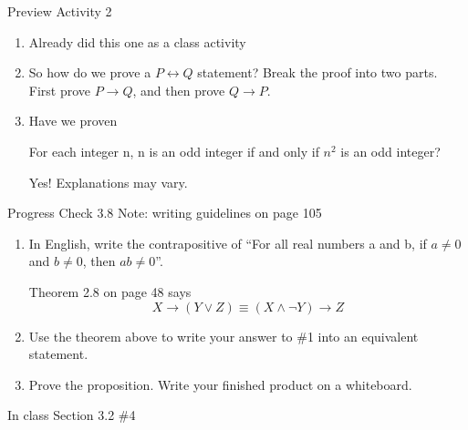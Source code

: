 \documentclass{beamer}
\begin{document}
\begin{frame}{Preview Activity 2}
    \begin{enumerate}
        \item Already did this one as a class activity
        \item So how do we prove a $P \leftrightarrow Q$ statement? \pause \; \; Break the proof into two parts.  First prove $P \to Q$, and then prove $Q \to P$.
        \item Have we proven \par
        For each integer n, n is an odd integer if and only if $n^2$ is an odd integer? \pause \par
        Yes!  Explanations may vary.
    \end{enumerate}
\end{frame}

\begin{frame}{Progress Check 3.8}
    Note: writing guidelines on page 105 \pause \par
    
    \begin{enumerate}
        \item In English, write the contrapositive of ``For all real numbers a and b, if $a \neq 0$ and $b \neq 0$, then $ab \neq 0$''.
        
        \pause
        Theorem 2.8 on page 48 says
        \[
        X \to (Y \vee Z) \equiv (X \wedge \neg Y) \to Z
        \]
        \pause
        \item Use the theorem above to write your answer to \#1 into an equivalent statement. \pause
        \item Prove the proposition.  Write your finished product on a whiteboard.
    \end{enumerate}
\end{frame}

\begin{frame}{In class}
    Section 3.2 \#4
\end{frame}
\end{document}
